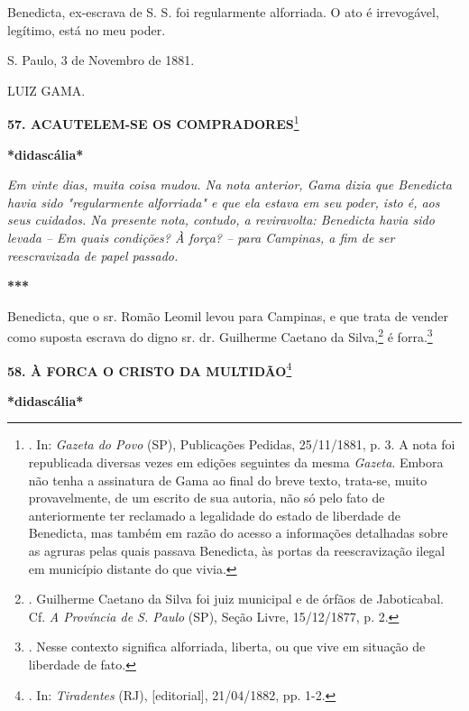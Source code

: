 Benedicta, ex-escrava de S. S. foi regularmente alforriada. O ato é
irrevogável, legítimo, está no meu poder.

S. Paulo, 3 de Novembro de 1881.

LUIZ GAMA.

\textbf{57. ACAUTELEM-SE OS COMPRADORES}\footnote{. In: \emph{Gazeta do
  Povo} (SP), Publicações Pedidas, 25/11/1881, p. 3. A nota foi
  republicada diversas vezes em edições seguintes da mesma
  \emph{Gazeta}. Embora não tenha a assinatura de Gama ao final do breve
  texto, trata-se, muito provavelmente, de um escrito de sua autoria,
  não só pelo fato de anteriormente ter reclamado a legalidade do estado
  de liberdade de Benedicta, mas também em razão do acesso a informações
  detalhadas sobre as agruras pelas quais passava Benedicta, às portas
  da reescravização ilegal em município distante do que vivia.}

\textbf{*didascália*}

\emph{Em vinte dias, muita coisa mudou. Na nota anterior, Gama dizia que
Benedicta havia sido "regularmente alforriada" e que ela estava em seu
poder, isto é, aos seus cuidados. Na presente nota, contudo, a
reviravolta: Benedicta havia sido levada -- Em quais condições? À força?
-- para Campinas, a fim de ser reescravizada de papel passado.}

\textbf{***}

Benedicta, que o sr. Romão Leomil levou para Campinas, e que trata de
vender como suposta escrava do digno sr. dr. Guilherme Caetano da
Silva,\footnote{. Guilherme Caetano da Silva foi juiz municipal e de
  órfãos de Jaboticabal. Cf. \emph{A Província de S. Paulo} (SP), Seção
  Livre, 15/12/1877, p. 2.} é forra.\footnote{. Nesse contexto significa
  alforriada, liberta, ou que vive em situação de liberdade de fato.}

\textbf{58. À FORCA O CRISTO DA MULTIDÃO}\footnote{. In:
  \emph{Tiradentes} (RJ), {[}editorial{]}, 21/04/1882, pp. 1-2.}

\textbf{*didascália*}

